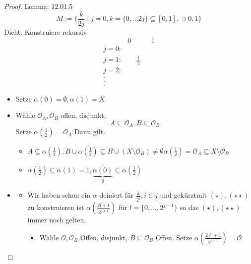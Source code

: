 \begin{proof}{Lemma: 12.01.5}
    $$M:=\{\frac{k}{2j}\mid j = 0, k = \{0,\dots 2j\} \subseteq [0,1], \ni 0,1\}$$
    Dicht.
    Konstruiere rekursiv
    \begin{equation*}
    \begin{array}{ccccccc}
             & 0 & & & 1\\
    j = 0:   &   & & &  \\
    j = 1:   &   & \frac{1}{2} & &\\
    j = 2:   & & & & \\
    .\\
    .\\
    .
    \end{array}
\end{equation*}
\begin{itemize}
    \item[j=0:] Setze $\alpha(0)=\emptyset, \alpha(1) = X$
    \item[j = 1:] Wähle $\mathcal{O}_A,\mathcal{O}_B$ offen, disjunkt; 
    $$ A \subseteq \mathcal{O}_A, B \subseteq \mathcal{O}_B$$
    Setze $\alpha(\frac{1}{2}) = \mathcal{O}_A$ Dann gilt.\\
    \begin{itemize}
        \item[$(\star)$] $A \subseteq \alpha(\frac{1}{2}),
         B\cup \overline{\alpha(\frac{1}{2})} \subseteq B \cup (X\setminus \mathcal{O}_B) \neq \emptyset
         \alpha(\frac{1}{2}) = \mathcal{O}_A \subseteq X \setminus \mathcal{O}_B$
         \item[$(\star \star)$] $\overline{\alpha(\frac{1}{2})} \subseteq \alpha(1) = 1, 
         \underbrace{\overline{\alpha(0)}}_{\emptyset} \subseteq \alpha(\frac{1}{2})$
    \end{itemize}
    \item[j = $\mapsto$ j+1] 
    \begin{itemize}
        \item[IV:] Wir haben schon ein $\alpha$ deiniert für $\frac{k}{2^i},i\in j$ und gekürztmit 
        $(\star),( \star \star)$
        zu konstruieren ist $\alpha(\frac{2l+1}{2^{j+1}})$ für $l=\{0,\dots,2^{j-1}\}$ so das 
        $(\star), (\star \star)$ immer noch gelten.
        \begin{itemize}
            \item[Fall: $l=2^{j-1}$:] Wähle $\mathcal{O},\mathcal{O}_B$ Offen, disjunkt, $B\subseteq 
            \mathcal{O}_B$ Offen. Setze $\alpha( \frac{2\ell+1}{2^{i+1}}) = \mathcal{O}$

\end{itemize}
\end{itemize}
\end{itemize}
\end{proof}
